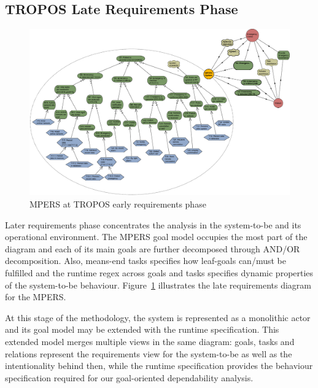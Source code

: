
\subsection{TROPOS Late Requirements Phase}

\begin{figure}[h!]
\centering
\includegraphics[width=1\textwidth]{imgs/MPERS_LR.png}
\caption{MPERS at TROPOS early requirements phase}
\label{fig:MPERS_LR}
\end{figure}


Later requirements phase concentrates the analysis in the system-to-be and its operational environment. The MPERS goal model occupies the most part of the diagram and each of its main goals are further decomposed through AND/OR decomposition. Also, means-end tasks specifies how leaf-goals can/must be fulfilled and the runtime regex across goals and tasks specifies dynamic properties of the system-to-be behaviour. Figure~\ref{fig:MPERS_LR} illustrates the late requirements diagram for the MPERS.

At this stage of the methodology, the system is represented as a monolithic actor and its goal model may be extended with the runtime specification. This extended model merges multiple views in the same diagram: goals, tasks and relations represent the requirements view for the system-to-be as well as the intentionality behind then, while the runtime specification provides the behaviour specification required for our goal-oriented dependability analysis. 


